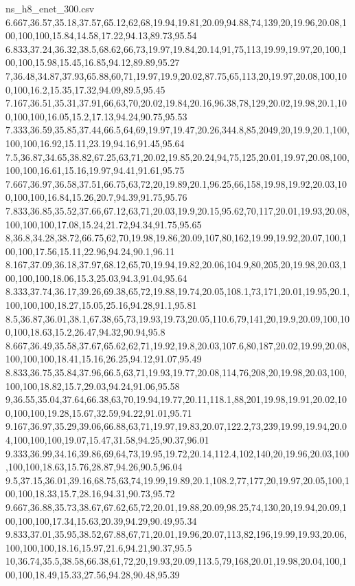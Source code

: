 \begin{filecontents*}[overwrite]{ns_h8_enet_300.csv}
6.667,36.57,35.18,37.57,65.12,62,68,19.94,19.81,20.09,94.88,74,139,20,19.96,20.08,100,100,100,15.84,14.58,17.22,94.13,89.73,95.54
6.833,37.24,36.32,38.5,68.62,66,73,19.97,19.84,20.14,91,75,113,19.99,19.97,20,100,100,100,15.98,15.45,16.85,94.12,89.89,95.27
7,36.48,34.87,37.93,65.88,60,71,19.97,19.9,20.02,87.75,65,113,20,19.97,20.08,100,100,100,16.2,15.35,17.32,94.09,89.5,95.45
7.167,36.51,35.31,37.91,66,63,70,20.02,19.84,20.16,96.38,78,129,20.02,19.98,20.1,100,100,100,16.05,15.2,17.13,94.24,90.75,95.53
7.333,36.59,35.85,37.44,66.5,64,69,19.97,19.47,20.26,344.8,85,2049,20,19.9,20.1,100,100,100,16.92,15.11,23.19,94.16,91.45,95.64
7.5,36.87,34.65,38.82,67.25,63,71,20.02,19.85,20.24,94,75,125,20.01,19.97,20.08,100,100,100,16.61,15.16,19.97,94.41,91.61,95.75
7.667,36.97,36.58,37.51,66.75,63,72,20,19.89,20.1,96.25,66,158,19.98,19.92,20.03,100,100,100,16.84,15.26,20.7,94.39,91.75,95.76
7.833,36.85,35.52,37.66,67.12,63,71,20.03,19.9,20.15,95.62,70,117,20.01,19.93,20.08,100,100,100,17.08,15.24,21.72,94.34,91.75,95.65
8,36.8,34.28,38.72,66.75,62,70,19.98,19.86,20.09,107,80,162,19.99,19.92,20.07,100,100,100,17.56,15.11,22.96,94.24,90.1,96.11
8.167,37.09,36.18,37.97,68.12,65,70,19.94,19.82,20.06,104.9,80,205,20,19.98,20.03,100,100,100,18.06,15.3,25.03,94.3,91.04,95.64
8.333,37.74,36.17,39.26,69.38,65,72,19.88,19.74,20.05,108.1,73,171,20.01,19.95,20.1,100,100,100,18.27,15.05,25.16,94.28,91.1,95.81
8.5,36.87,36.01,38.1,67.38,65,73,19.93,19.73,20.05,110.6,79,141,20,19.9,20.09,100,100,100,18.63,15.2,26.47,94.32,90.94,95.8
8.667,36.49,35.58,37.67,65.62,62,71,19.92,19.8,20.03,107.6,80,187,20.02,19.99,20.08,100,100,100,18.41,15.16,26.25,94.12,91.07,95.49
8.833,36.75,35.84,37.96,66.5,63,71,19.93,19.77,20.08,114,76,208,20,19.98,20.03,100,100,100,18.82,15.7,29.03,94.24,91.06,95.58
9,36.55,35.04,37.64,66.38,63,70,19.94,19.77,20.11,118.1,88,201,19.98,19.91,20.02,100,100,100,19.28,15.67,32.59,94.22,91.01,95.71
9.167,36.97,35.29,39.06,66.88,63,71,19.97,19.83,20.07,122.2,73,239,19.99,19.94,20.04,100,100,100,19.07,15.47,31.58,94.25,90.37,96.01
9.333,36.99,34.16,39.86,69,64,73,19.95,19.72,20.14,112.4,102,140,20,19.96,20.03,100,100,100,18.63,15.76,28.87,94.26,90.5,96.04
9.5,37.15,36.01,39.16,68.75,63,74,19.99,19.89,20.1,108.2,77,177,20,19.97,20.05,100,100,100,18.33,15.7,28.16,94.31,90.73,95.72
9.667,36.88,35.73,38.67,67.62,65,72,20.01,19.88,20.09,98.25,74,130,20,19.94,20.09,100,100,100,17.34,15.63,20.39,94.29,90.49,95.34
9.833,37.01,35.95,38.52,67.88,67,71,20.01,19.96,20.07,113,82,196,19.99,19.93,20.06,100,100,100,18.16,15.97,21.6,94.21,90.37,95.5
10,36.74,35.5,38.58,66.38,61,72,20,19.93,20.09,113.5,79,168,20.01,19.98,20.04,100,100,100,18.49,15.33,27.56,94.28,90.48,95.39

\end{filecontents*}
